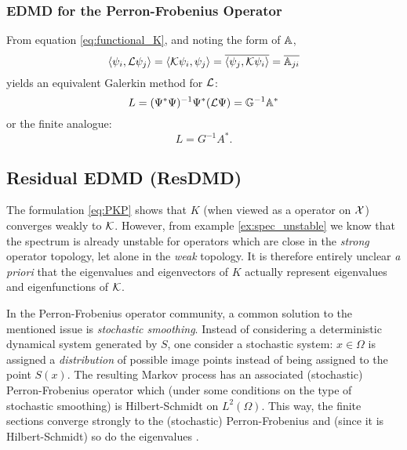 \subsubsection{EDMD for the Perron-Frobenius Operator}

From equation \ref{eq:functional_K}, and noting the form of $\mathbb{A}$, 
\begin{equation}
    \left\langle \psi_i, \mathcal{L} \psi_j \right\rangle 
    = \left\langle \mathcal{K} \psi_i, \psi_j \right\rangle 
    = \overline{ \left\langle \psi_j, \mathcal{K} \psi_i \right\rangle } 
    = \overline{\mathbb{A}_{j i}}
\end{equation}
yields an equivalent Galerkin method for $\mathcal{L}$:
\begin{equation}
    L = (\Psi^* \Psi)^{-1} \Psi^* (\mathcal{L} \Psi) = \mathbb{G}^{-1} \mathbb{A}^* 
\end{equation}
or the finite analogue:
\begin{equation}
    L = G^{-1} A^* . 
\end{equation}

\subsection{Residual EDMD (ResDMD)}

The formulation \ref{eq:PKP} shows that $K$ (when viewed as a operator on $\mathcal{X}$) 
converges weakly to $\mathcal{K}$. However, from example \ref{ex:spec_unstable} we know that 
the spectrum is already unstable for operators which are close in the \emph{strong} 
operator topology, let alone in the \emph{weak} topology. It is therefore entirely 
unclear \emph{a priori} that the eigenvalues and eigenvectors of $K$ actually represent 
eigenvalues and eigenfunctions of $\mathcal{K}$. 

In the Perron-Frobenius operator community, a common solution to the mentioned issue is 
\emph{stochastic smoothing}. Instead of considering a deterministic dynamical system 
generated by $S$, one consider a stochastic system: $x \in \Omega$ is 
assigned a \emph{distribution} of possible image points instead of being assigned to 
the point $S(x)$. The resulting Markov process has an associated (stochastic) 
Perron-Frobenius operator which (under some conditions on the type of stochastic 
smoothing) is Hilbert-Schmidt on $L^2 (\Omega)$. This way, the finite sections converge 
strongly to the (stochastic) Perron-Frobenius and (since it is Hilbert-Schmidt) so do 
the eigenvalues \cite{attr}. 


